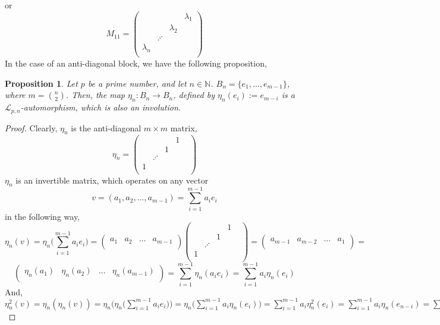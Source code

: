 \documentclass[12pt]{article}
\newtheorem{proposition}[theorem]{Proposition}
\begin{document}
or
$$M_{11}=\begin{pmatrix}
& & & \lambda_1\\
& & \lambda_2 &\\
& \iddots & &\\
\lambda_n & & &\\
\end{pmatrix}$$
In the case of an anti-diagonal block, we have the following proposition,
\begin{proposition}
\label{prop.involution}
Let $p$ be a prime number, and let $n\in\mathbb{N}$. $B_n=\{e_1,\dots,e_{m-1}\}$, where $m=\binom{n}{2}$. Then, the map $\eta_n:B_n\rightarrow B_n$, defined by $\eta_n(e_i):=e_{m-i}$ is a $\mathcal{L}_{p,n}$-automorphism, which is also an involution.
\end{proposition}
\begin{proof}
Clearly, $\eta_n$ is the anti-diagonal $m\times m$ matrix,$$
\eta_n=\begin{pmatrix}
& & & 1 &\\
& & 1 &\\
& \iddots & &\\
1 & & &\\
\end{pmatrix}
$$
$\eta_n$ is an invertible matrix, which operates on any vector $$v=(a_1,a_2,\dots,a_{m-1})=\sum_{i=1}^{m-1}a_ie_i$$ in the following way,$$
\eta_n(v)=\eta_n\bigg(\sum_{i=1}^{m-1}a_ie_i\bigg)=\begin{pmatrix}
a_1 & a_2 & \dots & a_{m-1}\\
\end{pmatrix}\begin{pmatrix}
& & & 1 &\\
& & 1 &\\
& \iddots & &\\
1 & & &\\
\end{pmatrix}=\begin{pmatrix}
a_{m-1} & a_{m-2} & \dots & a_1\\
\end{pmatrix}=$$
$$\begin{pmatrix}
\eta_n(a_1) & \eta_n(a_2) & \dots & \eta_n(a_{m-1})\\
\end{pmatrix}=\sum_{i=1}^{m-1}\eta_n(a_ie_i)=\sum_{i=1}^{m-1}a_i\eta_n(e_i)
$$
And, $\eta_n^2(v)=\eta_n(\eta_n(v))=\eta_n\bigg(\eta_n\bigg(\sum_{i=1}^{m-1}a_ie_i\bigg)\bigg)=\eta_n\bigg(\sum_{i=1}^{m-1}a_i\eta_n(e_i)\bigg)=\sum_{i=1}^{m-1}a_i\eta_n^2(e_i)=\sum_{i=1}^{m-1}a_i\eta_n(e_{n-i})=\sum_{i=1}^{m-1}a_ie_i$
\end{proof}
\end{document}
